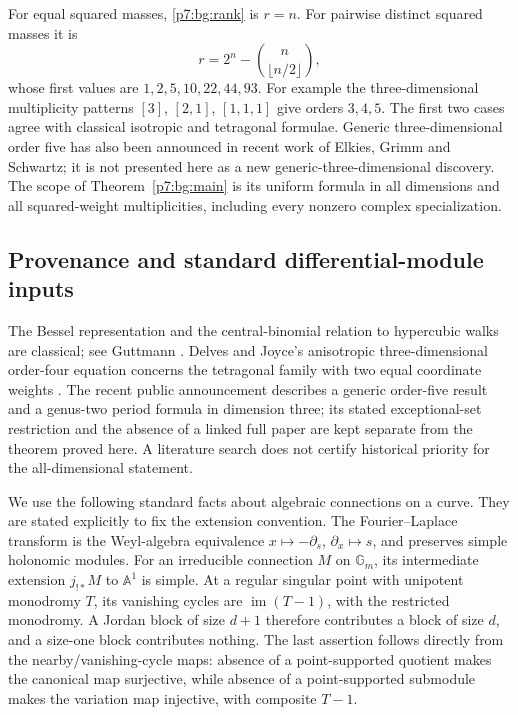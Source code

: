 \documentclass[11pt,a4paper]{article}
\theoremstyle{definition}
\theoremstyle{remark}
\numberwithin{equation}{section}
\begin{document}
For equal squared masses, \eqref{p7:bg:rank} is $r=n$.
For pairwise distinct squared masses it is
\[
 r=2^n-\binom n{\lfloor n/2\rfloor},
\]
whose first values are $1,2,5,10,22,44,93$.
For example the three-dimensional multiplicity patterns
$[3]$, $[2,1]$, $[1,1,1]$ give orders $3,4,5$.
The first two cases agree with classical isotropic and tetragonal
formulae.  Generic three-dimensional order five has also been
announced in recent work of Elkies, Grimm and Schwartz; it is not
presented here as a new generic-three-dimensional discovery.
The scope of Theorem~\ref{p7:bg:main} is its uniform formula in all
dimensions and all squared-weight multiplicities, including every
nonzero complex specialization.

\subsection{Provenance and standard differential-module inputs}

The Bessel representation and the central-binomial relation to
hypercubic walks are classical; see Guttmann \cite{p5:BG_Guttmann2010}.
Delves and Joyce's anisotropic three-dimensional order-four equation
concerns the tetragonal family with two equal coordinate weights
\cite{p5:BG_DelvesJoyce2001}.  The recent public announcement
\cite{p5:BG_WatsonAnnouncement} describes a generic order-five result
and a genus-two period formula in dimension three; its stated
exceptional-set restriction and the absence of a linked full paper
are kept separate from the theorem proved here.  A literature
search does not certify historical priority for the all-dimensional
statement.

We use the following standard facts about algebraic connections on
a curve.  They are stated explicitly to fix the extension convention.
The Fourier--Laplace transform is the Weyl-algebra equivalence
$x\mapsto-\partial_s$, $\partial_x\mapsto s$, and preserves simple
holonomic modules.  For an irreducible connection $M$ on
$\mathbb G_m$, its intermediate extension $j_{!*}M$ to
$\mathbb A^1$ is simple.  At a regular singular point with unipotent
monodromy $T$, its vanishing cycles are $\operatorname{im}(T-1)$,
with the restricted monodromy.  A Jordan block of size $d+1$
therefore contributes a block of size $d$, and a size-one block
contributes nothing.  The last assertion follows directly from the
nearby/vanishing-cycle maps: absence of a point-supported quotient
makes the canonical map surjective, while absence of a point-supported
submodule makes the variation map injective, with composite $T-1$.
\end{document}
